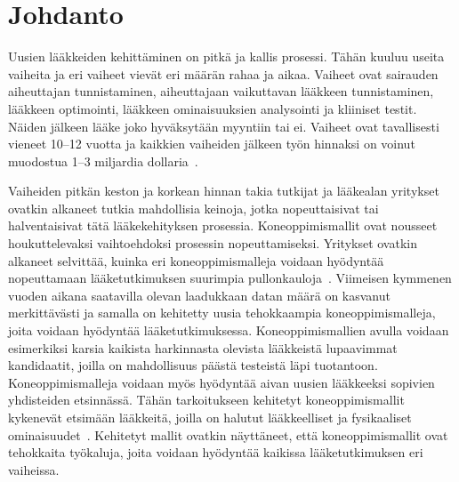 \documentclass[finnish,twoside,censored,tkt,sw-line]{HYthesisML}
\begin{document}
\newpage
\mytableofcontents{}
\mainmatter{}


%
%
%
% 


\chapter{Johdanto}

Uusien lääkkeiden kehittäminen on pitkä ja kallis prosessi.
Tähän kuuluu useita vaiheita ja eri vaiheet vievät eri määrän rahaa ja aikaa.
Vaiheet ovat sairauden aiheuttajan tunnistaminen, aiheuttajaan vaikuttavan lääkkeen tunnistaminen, lääkkeen optimointi, lääkkeen ominaisuuksien analysointi ja kliiniset testit.
Näiden jälkeen lääke joko hyväksytään myyntiin tai ei.
Vaiheet ovat tavallisesti vieneet 10--12 vuotta ja kaikkien vaiheiden jälkeen työn hinnaksi on voinut muodostua 1--3 miljardia dollaria~\cite{EkinsSean2019Emlf}.

Vaiheiden pitkän keston ja korkean hinnan takia tutkijat ja lääkealan yritykset ovatkin alkaneet tutkia mahdollisia keinoja, jotka nopeuttaisivat tai halventaisivat tätä lääkekehityksen prosessia.
Koneoppimismallit ovat nousseet houkuttelevaksi vaihtoehdoksi prosessin nopeuttamiseksi.
Yritykset ovatkin alkaneet selvittää, kuinka eri koneoppimismalleja voidaan hyödyntää nopeuttamaan lääketutkimuksen suurimpia pullonkauloja~\cite{EkinsSean2019Emlf}.
Viimeisen kymmenen vuoden aikana saatavilla olevan laadukkaan datan määrä on kasvanut merkittävästi ja samalla on kehitetty uusia tehokkaampia koneoppimismalleja, joita voidaan hyödyntää lääketutkimuksessa.
Koneoppimismallien avulla voidaan esimerkiksi karsia kaikista harkinnasta olevista lääkkeistä lupaavimmat kandidaatit, joilla on mahdollisuus päästä testeistä läpi tuotantoon.
Koneoppimismalleja voidaan myös hyödyntää aivan uusien lääkkeeksi sopivien yhdisteiden etsinnässä.
Tähän tarkoitukseen kehitetyt koneoppimismallit kykenevät etsimään lääkkeitä, joilla on halutut lääkkeelliset ja fysikaaliset ominaisuudet~\cite{VamathevanJessica2019Aoml}.
Kehitetyt mallit ovatkin näyttäneet, että koneoppimismallit ovat tehokkaita työkaluja, joita voidaan hyödyntää kaikissa lääketutkimuksen eri vaiheissa.
\end{document}
